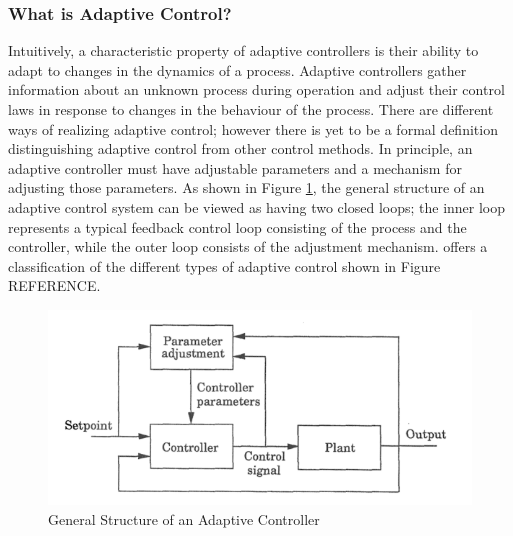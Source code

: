 \documentclass[9pt, twoside]{article}
\begin{document}
\begin{multicols}{2}
\subsubsection{What is Adaptive Control?}
Intuitively, a characteristic property of adaptive controllers is their ability to adapt to changes in the dynamics of a process. Adaptive controllers gather information about an unknown process during operation and adjust their control laws in response to changes in the behaviour of the process. There are different ways of realizing adaptive control; however there is yet to be a formal definition distinguishing adaptive control from other control methods.\cite{aastrom2013adaptive} In principle, an adaptive controller must have adjustable parameters and a mechanism for adjusting those parameters. As shown in Figure \ref{Fig:General Structure}, the general structure of an adaptive control system can be viewed as having two closed loops; the inner loop  represents a typical feedback control loop consisting of the process and the controller, while the outer loop consists of the adjustment mechanism. \cite{Isermann:1992:ACS:573881} offers a classification of the different types of adaptive control shown in Figure REFERENCE.
\begin{figure}[H]
  \includegraphics[width=0.9\linewidth]{General_Adaptive_Control.png}
  \caption{General Structure of an Adaptive Controller}
  \label{Fig:General Structure}
\end{figure}


\end{multicols}
\end{document}
